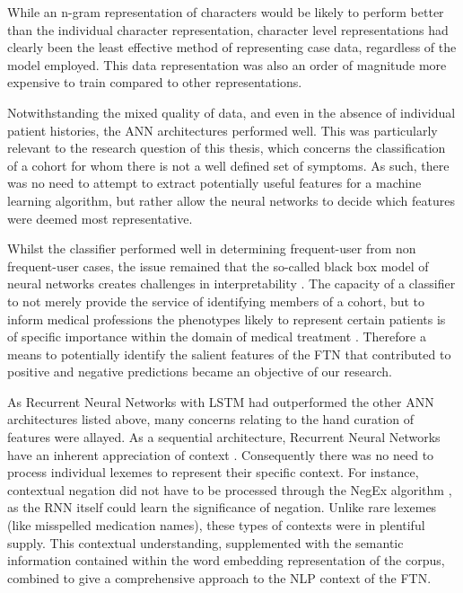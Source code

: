 While an n-gram representation of characters would be likely to perform better than the individual character representation, character level representations had clearly been the least effective method of representing case data, regardless of the model employed. This data representation was also an order of magnitude more expensive to train compared to other representations.     

Notwithstanding the mixed quality of data, and even in the absence of individual patient histories, the ANN architectures performed well. This was particularly relevant to the research question of this thesis, which concerns the classification of a cohort for whom there is not a well defined set of symptoms. As such, there was no need to attempt to extract potentially useful features for a machine learning algorithm, but rather allow the neural networks to decide which features were deemed most representative.  

Whilst the classifier performed well in determining frequent-user from non frequent-user cases, the issue remained that the so-called black box model of neural networks creates challenges in interpretability \cite{liu2018improving}. The capacity of a classifier to not merely provide the service of identifying members of a cohort, but to inform medical professions the phenotypes likely to represent certain patients is of specific importance within the domain of medical treatment \cite{london2019artificial,preece2018asking}. Therefore a means to potentially identify the salient features of the FTN that contributed to positive and negative predictions became an objective of our research.



As Recurrent Neural Networks with LSTM had outperformed the other ANN architectures listed above, many concerns relating to the hand curation of features were allayed. As a sequential architecture, Recurrent Neural Networks have an inherent appreciation of context \cite{yin2017comparative}. Consequently there was no need to process individual lexemes to represent their specific context. For instance, contextual negation did not have to be processed through the NegEx algorithm \cite{chapman2001simple}, as the RNN itself could learn the significance of negation. Unlike rare lexemes (like misspelled medication names), these types of contexts were in plentiful supply. This contextual understanding, supplemented with the semantic information contained within the word embedding representation of the corpus, combined to give a comprehensive approach to the NLP context of the FTN.

